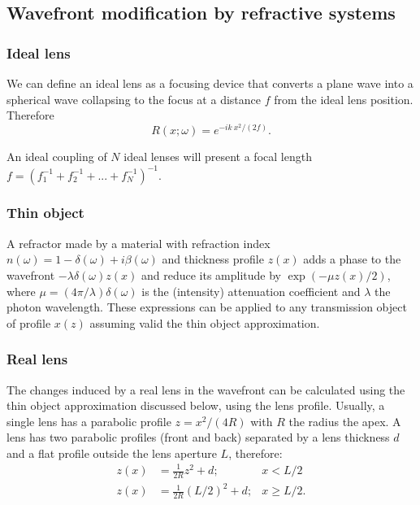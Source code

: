 \documentclass{iucr}              %
\begin{document}
\subsection{Wavefront modification by refractive systems}

\subsubsection{Ideal lens}
We can define an ideal lens as a focusing device that converts a plane wave into a spherical wave collapsing to the focus at a distance $f$ from the ideal lens position. Therefore
\begin{equation}
    R(x;\omega) = e^{-i k~x^2/(2 f)}.
\end{equation}

An ideal coupling of $N$ ideal lenses will present a focal length $f=(f_1^{-1}+f_2^{-1}+...+f_N^{-1})^{-1}$. 

\subsubsection{Thin object} A refractor made by a material with refraction index $n(\omega)=1-\delta(\omega)+i\beta(\omega)$ 
and thickness profile $z(x)$ adds a phase to the wavefront $-\lambda \delta(\omega) z(x)$ and reduce its amplitude by $\exp(-\mu z(x)/2)$, where $\mu=(4 \pi/\lambda) \delta(\omega)$ is the (intensity) attenuation coefficient and $\lambda$ the photon wavelength. These expressions can be applied to any transmission object of profile $x(z)$ assuming valid the thin object approximation. 


\subsubsection{Real lens} The changes induced by a real lens in the wavefront can be calculated using the thin object approximation discussed below, using the lens profile. Usually, a single lens has a parabolic profile $z=x^2/(4R)$ with $R$ the radius the apex. A lens has two parabolic profiles (front and back) separated by a lens thickness $d$ and a flat profile outside the lens aperture $L$, therefore:
\begin{align}
    z(x) &= \frac{1}{2R} z^2 + d; & x < L/2\\ \nonumber
    z(x) &= \frac{1}{2R} (L/2)^2 + d; & x \ge L/2.
\end{align}
\end{document}
